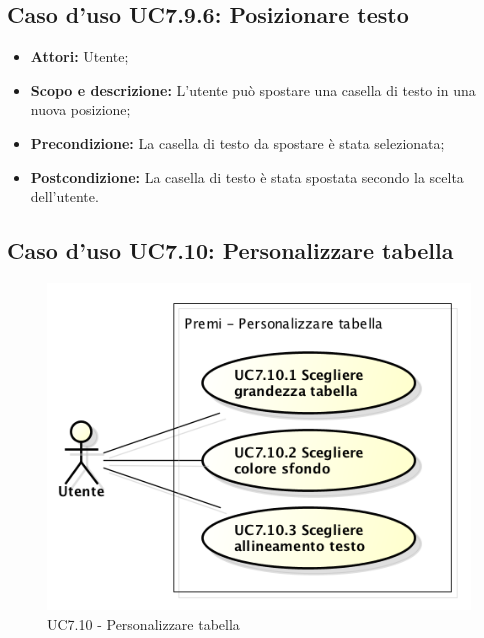 \subsection{Caso d'uso UC7.9.6: Posizionare testo}
\begin{itemize}
	\item \textbf{Attori:} Utente;
	\item \textbf{Scopo e descrizione:} L'utente può spostare una casella di testo in una nuova posizione;
	\item \textbf{Precondizione:} La casella di testo da spostare è stata selezionata;
	\item \textbf{Postcondizione:} La casella di testo è stata spostata secondo la scelta dell'utente.
\end{itemize}


\subsection{Caso d'uso UC7.10: Personalizzare tabella}
\begin{figure}[h] 
	\centering 
	\includegraphics[scale=0.45] {img/UC7.10.png} 
	\caption{UC7.10 - Personalizzare tabella} 
\end{figure}

